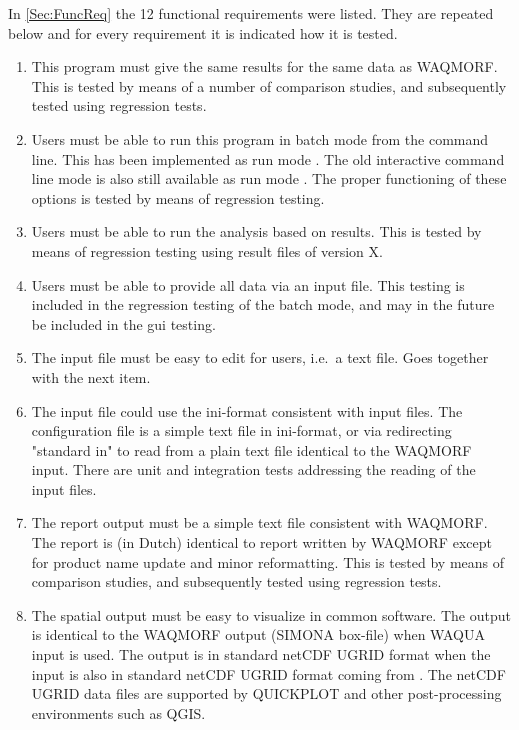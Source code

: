 In \autoref{Sec:FuncReq} the 12 functional requirements were listed.
They are repeated below and for every requirement it is indicated how it is tested.

\begin{enumerate}
\item This program must give the same results for the same data as WAQMORF.
This is tested by means of a number of comparison studies, and subsequently tested using regression tests.

\item Users must be able to run this program in batch mode from the command line.
This has been implemented as run mode .
The old interactive command line mode is also still available as run mode .
The proper functioning of these options is tested by means of regression testing.

\item Users must be able to run the analysis based on \dflowfm results.
This is tested by means of regression testing using result files of \dflowfm version X.

\item Users must be able to provide all data via an input file.
This testing is included in the regression testing of the batch mode, and may in the future be included in the gui testing.

\item The input file must be easy to edit for users, i.e.~a text file.
Goes together with the next item.
\item The input file could use the ini-format consistent with \dflowfm input files.
The \dfastmi configuration file is a simple text file in ini-format, or via redirecting "standard in" to read from a plain text file identical to the WAQMORF input.
There are unit and integration tests addressing the reading of the input files.

\item The report output must be a simple text file consistent with WAQMORF.
The report is (in Dutch) identical to report written by WAQMORF except for product name update and minor reformatting.
This is tested by means of comparison studies, and subsequently tested using regression tests.

\item The spatial output must be easy to visualize in common software.
The output is identical to the WAQMORF output (SIMONA box-file) when WAQUA input is used.
The output is in standard netCDF UGRID format when the input is also in standard netCDF UGRID format coming from \dflowfm.
The netCDF UGRID data files are supported by QUICKPLOT and other post-processing environments such as QGIS.


\end{enumerate}
